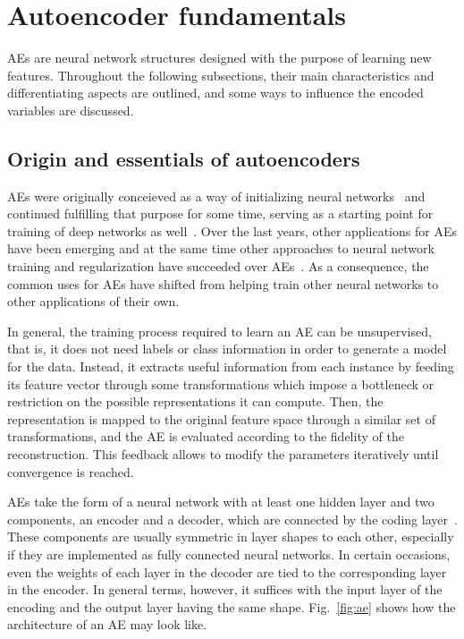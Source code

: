 \section{Autoencoder fundamentals}\label{sec:ae}

AEs are neural network structures designed with the purpose of learning new features. Throughout the following subsections, their main characteristics and differentiating aspects are outlined, and some ways to influence the encoded variables are discussed.

\subsection{Origin and essentials of autoencoders}

AEs were originally conceieved as a way of initializing neural networks~ and continued fulfilling that purpose for some time, serving as a starting point for training of deep networks as well~. Over the last years, other applications for AEs have been emerging and at the same time other approaches to neural network training and regularization have succeeded over AEs~. As a consequence,  the common uses for AEs have shifted from helping train other neural networks to other applications of their own.

In general, the training process required to learn an AE can be unsupervised, that is, it does not need labels or class information in order to generate a model for the data. Instead, it extracts useful information from each instance by feeding its feature vector through some transformations which impose a bottleneck or restriction on the possible representations it can compute. Then, the representation is mapped to the original feature space through a similar set of transformations, and the AE is evaluated according to the fidelity of the reconstruction. This feedback allows to modify the parameters iteratively until convergence is reached.

AEs take the form of a neural network with at least one hidden layer and two components, an encoder and a decoder, which are connected by the coding layer~. These components are usually symmetric in layer shapes to each other, especially if they are implemented as fully connected neural networks. In certain occasions, even the weights of each layer in the decoder are tied to the corresponding layer in the encoder. In general terms, however, it suffices with the input layer of the encoding and the output layer having the same shape. Fig.~\ref{fig:ae} shows how the architecture of an AE may look like.

